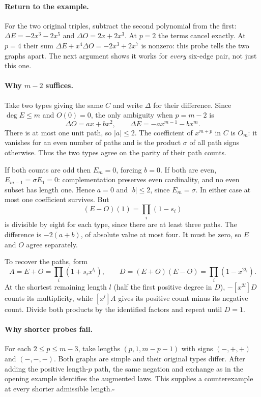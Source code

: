 \documentclass[11pt]{article}
\begin{document}
\paragraph{Return to the example.}
For the two original triples, subtract the second polynomial from the first:
$\Delta E=-2x^3-2x^5$ and $\Delta O=2x+2x^3$. At $p=2$ the terms cancel
exactly. At $p=4$ their sum $\Delta E+x^4\Delta O=-2x^3+2x^7$ is
nonzero: this probe tells the two graphs apart. The next argument shows
it works for \emph{every} six-edge pair, not just this one.

\newpage
\paragraph{Why $m-2$ suffices.}
Take two types giving the same $C$ and write $\Delta$ for their difference.
Since $\deg E\le m$ and $O(0)=0$, the only ambiguity when $p=m-2$ is
\[
 \Delta O=ax+bx^2,\qquad \Delta E=-a x^{m-1}-b x^m.
\]
There is at most one unit path, so $|a|\le2$. The coefficient of
$x^{m+p}$ in $C$ is $O_m$: it vanishes for an even number of paths and
is the product $\sigma$ of all path signs otherwise. Thus the two types
agree on the parity of their path counts.

If both counts are odd then $E_m=0$, forcing $b=0$. If both are even,
$E_{m-1}=\sigma E_1=0$: complementation preserves even cardinality, and
no even subset has length one. Hence $a=0$ and $|b|\le2$, since
$E_m=\sigma$. In either case at most one coefficient survives. But
\[
 (E-O)(1)=\prod_i(1-s_i)
\]
is divisible by eight for each type, since there are at least three paths.
The difference is $-2(a+b)$, of absolute value at most four. It must be
zero, so $E$ and $O$ agree separately.

To recover the paths, form
\[
 A=E+O=\prod_i(1+s_i x^{l_i}),\qquad
 D=(E+O)(E-O)=\prod_i(1-x^{2l_i}).
\]
At the shortest remaining length $l$ (half the first positive degree in
$D$), $-[x^{2l}]D$ counts its multiplicity, while $[x^l]A$ gives its
positive count minus its negative count. Divide both products by the
identified factors and repeat until $D=1$.

\paragraph{Why shorter probes fail.}
For each $2\le p\le m-3$, take lengths $(p,1,m-p-1)$ with signs
$(-,+,+)$ and $(-,-,-)$. Both graphs are simple and their original
types differ. After adding the positive length-$p$ path, the same negation
and exchange as in the opening example identifies the augmented laws.
This supplies a counterexample at every shorter admissible length.\hfill$\square$
\end{document}
